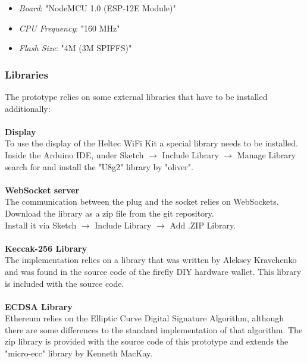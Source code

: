 \begin{itemize}
    \item \textit{Board}: "NodeMCU 1.0 (ESP-12E Module)"
    \item \textit{CPU Frequency}: "160 MHz"
    \item \textit{Flash Size}: "4M (3M SPIFFS)"
\end{itemize}
\leavevmode
\subsubsection{Libraries}
The prototype relies on some external libraries that have to be installed additionally:
\\\\
\textbf{Display}\\
To use the display of the Heltec WiFi Kit a special library needs to be installed.
Inside the Arduino IDE, under Sketch $\rightarrow$ Include Library $\rightarrow$ Manage Library search for and install the "U8g2" library by "oliver".
\\\\
\textbf{WebSocket server}\\
The communication between the plug and the socket relies on WebSockets. Download the library as a zip file from the git repository\cite{websockets}.
\\
Install it via Sketch $\rightarrow$ Include Library $\rightarrow$ Add .ZIP Library.
\\\\
\textbf{Keccak-256 Library}\\
The implementation relies on a library that was written by Aleksey Kravchenko and was found in the source code of the firefly DIY hardware wallet\cite{keccak-source}. This library is included with the source code.
\\\\
\textbf{ECDSA Library}\\
Ethereum relies on the Elliptic Curve Digital Signature Algorithm, although there are some differences to the standard implementation of that algorithm. The zip library is provided with the source code of this prototype and extends the "micro-ecc" library by Kenneth MacKay\cite{micro-ecc}.
\\

